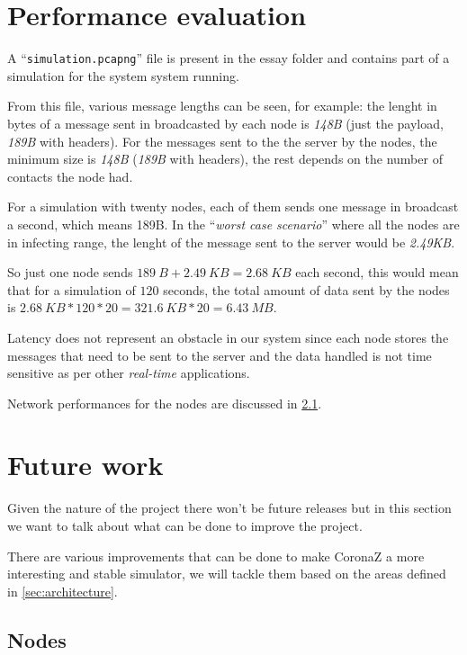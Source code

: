 \documentclass[conference]{IEEEtran}
\begin{document}
\section{Performance evaluation}\label{sec:performance}

	A ``\texttt{simulation.pcapng}'' file is present in the essay folder and contains part of a simulation for the system system running.

	From this file, various message lengths can be seen, for example: the lenght in bytes of a message sent in broadcasted by each node is \textit{148B} (just the payload, \textit{189B} with headers).
	For the messages sent to the the server by the nodes, the minimum size is \textit{148B} (\textit{189B} with headers), the rest depends on the number of contacts the node had.
	
	For a simulation with twenty nodes, each of them sends one message in broadcast a second, which means 189B.
	In the ``\textit{worst case scenario}'' where all the nodes are in infecting range, the lenght of the message sent to the server would be \textit{2.49KB}.
	
	So just one node sends $189~B + 2.49~KB = 2.68~KB$ each second, this would mean that for a simulation of $120$ seconds, the total amount of data sent by the nodes is $2.68~KB*120*20 = 321.6~KB*20 = 6.43~MB$.
	
	Latency does not represent an obstacle in our system since each node stores the messages that need to be sent to the server and the data handled is not time sensitive as per other \textit{real-time} applications.
	
	Network performances for the nodes are discussed in \ref{subsec:nodes_improvements}.

\section{Future work}\label{sec:future_work}

	Given the nature of the project there won't be future releases but in this section we want to talk about what can be done to improve the project.
	
	There are various improvements that can be done to make CoronaZ a more interesting and stable simulator, we will tackle them based on the areas defined in \ref{sec:architecture}.
	
	\subsection{Nodes}\label{subsec:nodes_improvements}
	
\end{document}

